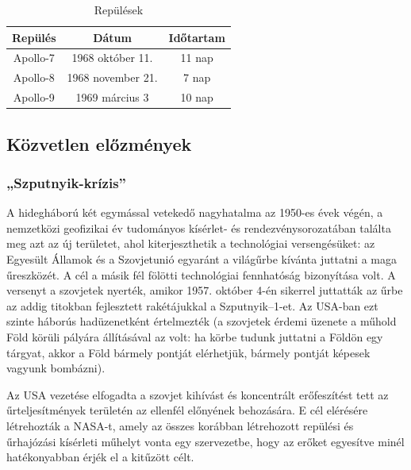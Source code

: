 \documentclass[12pt]{article}
\begin{document}
\begin{table}[htb]
  \caption{Repülések}
  \centering
  \begin{tabular}{ccc}
    \toprule
    Repülés & Dátum & Időtartam \\
    \midrule
    Apollo-7 & 1968 október 11. & 11 nap \\
    Apollo-8 & 1968 november 21. & 7 nap \\
    Apollo-9 & 1969 március 3 &  10 nap \\
    \bottomrule
  \end{tabular}
  \label{tab:repulesek}
\end{table}

\subsection{Közvetlen előzmények}

\subsubsection{„Szputnyik-krízis”}

A hidegháború két egymással vetekedő nagyhatalma az 1950-es évek végén, a nemzetközi geofizikai év tudományos kísérlet- és rendezvénysorozatában találta meg azt az új területet, ahol kiterjeszthetik a technológiai versengésüket: az Egyesült Államok és a Szovjetunió egyaránt a világűrbe kívánta juttatni a maga űreszközét. A cél a másik fél fölötti technológiai fennhatóság bizonyítása volt. A versenyt a szovjetek nyerték, amikor 1957. október 4-én sikerrel juttatták az űrbe az addig titokban fejlesztett rakétájukkal a Szputnyik–1-et. Az USA-ban ezt szinte háborús hadüzenetként értelmezték (a szovjetek érdemi üzenete a műhold Föld körüli pályára állításával az volt: ha körbe tudunk juttatni a Földön egy tárgyat, akkor a Föld bármely pontját elérhetjük, bármely pontját képesek vagyunk bombázni).

Az USA vezetése elfogadta a szovjet kihívást és koncentrált erőfeszítést tett az űrteljesítmények területén az ellenfél előnyének behozására. E cél elérésére létrehozták a NASA-t, amely az összes korábban létrehozott repülési és űrhajózási kísérleti műhelyt vonta egy szervezetbe, hogy az erőket egyesítve minél hatékonyabban érjék el a kitűzött célt. 



\end{document}
